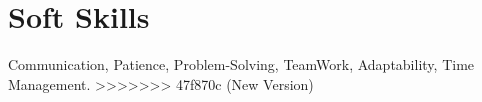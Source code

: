 \documentclass[]{resume-openfont}
\newcommand{\resumeHeading}[4]{\runsubsection{\uppercase{#1}}\descript{ | #2}\hfill\location{#3 | #4}\fakeNewLine}
\begin{document}
\section{Soft Skills}
Communication, Patience, Problem-Solving, TeamWork, Adaptability, Time Management.
\sectionsep
>>>>>>> 47f870c (New Version)

\end{document}
